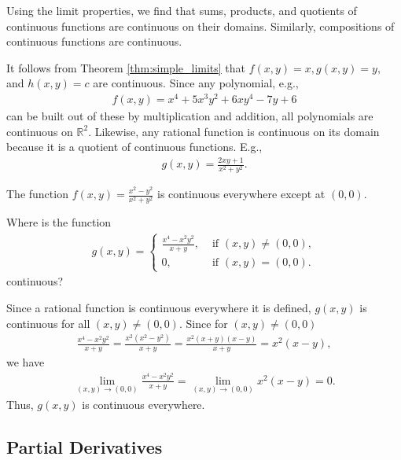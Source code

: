 \documentclass[12pt,letterpaper,reqno]{article}
\numberwithin{equation}{section}
\begin{document}
{Using the limit properties, we find that sums, products, and quotients of continuous functions are continuous on their domains. Similarly, compositions of continuous functions are continuous.  

It follows from Theorem \ref{thm:simple_limits} that $f(x,y)=x, g(x,y)=y,$ and $h(x,y)=c$ are continuous. Since any polynomial, e.g.,
\begin{align*}
	f(x,y)=x^4+5x^3y^2+6xy^4-7y+6
\end{align*}
can be built out of these by multiplication and addition, all polynomials are continuous on $\mathbb{R}^2$. Likewise, any rational function is continuous on its domain because it is a quotient of continuous functions. E.g.,
\begin{align*}
	g(x,y)=\frac{2xy+1}{x^2+y^2}.
\end{align*}

\begin{example}
The function $f(x,y)=\frac{x^2-y^2}{x^2+y^2}$ is continuous everywhere except at $(0,0)$.	
\end{example}

\begin{exercise}
Where is the function
\begin{align*}
	g(x,y)=\begin{cases}
		\frac{x^4-x^2y^2}{x+y}, &\text{ if } (x,y) \neq (0,0), \\
		0, &\text{ if } (x,y)=(0,0).
	\end{cases}
\end{align*}	
continuous?
\end{exercise}

{\color{red}
\begin{solution}
	Since a rational function is continuous everywhere it is defined, $g(x,y)$ is continuous for all $(x,y) \neq (0,0)$. Since for $(x,y) \neq (0,0)$
	\begin{align*}
		\frac{x^4-x^2y^2}{x+y}=\frac{x^2(x^2-y^2)}{x+y}=\frac{x^2(x+y)(x-y)}{x+y}=x^2(x-y),
	\end{align*}
	we have 
	\begin{align*}
		\lim_{(x,y) \to (0,0)}\frac{x^4-x^2y^2}{x+y}=\lim_{(x,y) \to (0,0)}x^2(x-y)=0.
	\end{align*}
	Thus, $g(x,y)$ is continuous everywhere.
\end{solution}}
\newpage

\subsection{Partial Derivatives}
}
\end{document}
